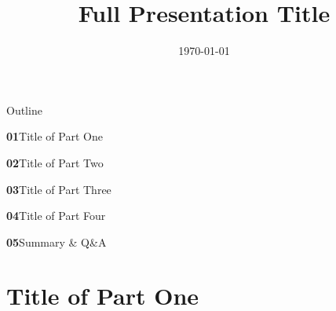 \documentclass[aspectratio=169,10pt,xcolor=table]{beamer}
\title[Short Title]{Full Presentation Title}
\subtitle{}
\author{}
\institute{}
\date{\today}
\begin{document}
\maketitle

\begin{frame}{Outline}
\vspace{1mm}
\large
\renewcommand{\baselinestretch}{1.8}\selectfont

\textbf{01}\hspace{1.2em}Title of Part One

\textbf{02}\hspace{1.2em}Title of Part Two

\textbf{03}\hspace{1.2em}Title of Part Three

\textbf{04}\hspace{1.2em}Title of Part Four

\textbf{05}\hspace{1.2em}Summary \& Q\&A
\end{frame}

\section{Title of Part One}
\end{document}
